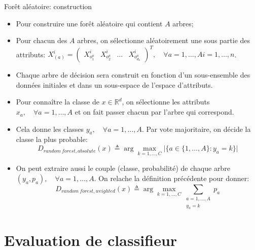 \documentclass[8pt]{beamer}
\begin{document}
				\begin{frame}{Forêt aléatoire: construction}
					\begin{itemize}
						\item<1-> Pour construire une forêt aléatoire qui contient \(A\) arbres;
						\item<2-> Pour chacun des \(A\) arbres, on sélectionne aléatoirement une sous partie des attributs: \(X^i_{(a)} = \begin{pmatrix}
							X^i_{o^a_1} & X^i_{o^a_2} & \dots & X^i_{o^a_{d_a}}
						\end{pmatrix}^T, \quad \forall a = 1,\dots,A  i=1,\dots,n\).
						\item<3-> Chaque arbre de décision sera construit en fonction d'un sous-ensemble des données initiales et dans un sous-espace de l'espace d'attributs.
						\item<4-> Pour connaître la classe de \(x \in \mathbb{R}^d\), on sélectionne les attributs \(x_a, \quad \forall a = 1,\dots,A\) et on fait passer chacun par l'arbre qui correspond.
						\item<5-> Cela donne les classes \(y_a, \quad \forall a = 1,\dots,A\). Par vote majoritaire, on décide la classe la plus probable:
							\begin{equation}
								D_{random\ forest, absolute} (x) \triangleq \arg \max_{k=1,\dots,C} \vert \{a \in \{1,\dots,A\}: y_a = k\} \vert
							\end{equation}
						\item<6-> On peut extraire aussi le couple (classe, probabilité) de chaque arbre \((y_a, p_a), \quad \forall a = 1,\dots,A\). On relache la définition précédente pour donner:
							\begin{equation}
								D_{random\ forest, weighted} (x) \triangleq \arg \max_{k=1,\dots,C} \sum_{\substack{a=1,\dots,A\\y_a = k}} p_a
							\end{equation}
					\end{itemize}
				\end{frame}
	
	\section{Evaluation de classifieur}
\end{document}
